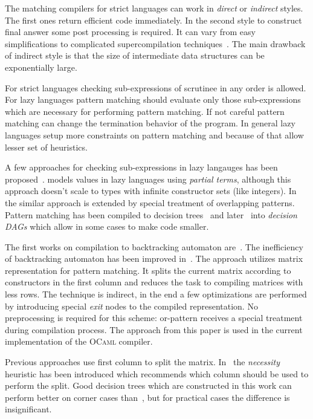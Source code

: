 The matching compilers for strict languages can work in \emph{direct} or \emph{indirect} styles. The first ones return efficient code immediately. In the second style to
construct final answer some post processing is required. It can vary from easy simplifications to complicated supercompilation techniques~\cite{sestoft1996}. The main
drawback of indirect style is that the size of intermediate data structures can be exponentially large.

For strict languages checking sub-expressions of scrutinee in any order is allowed. For lazy languages pattern matching should evaluate only those sub-expressions which are
necessary for performing pattern matching. If not careful pattern matching can change the termination behavior of the program. In general lazy languages setup more constraints
on pattern matching and because of that allow lesser set of heuristics.

A few approaches for checking sub-expressions in lazy langauges has been proposed~\cite{augustsson1985,laville1991}. \cite{laville1991} models values in lazy languages
using \emph{partial terms}, although this approach doesn't scale to types with infinite constructor sets (like integers). In~\cite{suarez1993} the similar approach is
extended by special treatment of overlapping patterns. Pattern matching has been compiled to decision trees~\cite{maranget1992} and later~\cite{maranget1992} into
\emph{decision DAGs} which allow in some cases to make code smaller.

The first works on compilation to backtracking automaton are~\cite{augustsson1985,wadler1987}. The inefficiency of backtracking automaton has been
improved in~\cite{maranget2001}. The approach utilizes matrix representation for pattern matching. It splits the current matrix according to constructors in the
first column and reduces the task to compiling matrices with less rows. The technique is indirect, in the end a few optimizations are performed by introducing
special \emph{exit} nodes to the compiled representation. No preprocessing is required for this scheme: or-pattern receives a special treatment during compilation process.
The approach from this paper is used in the current implementation of the \textsc{OCaml} compiler.

Previous approaches use first column to split the matrix. In~\cite{maranget2008} the \emph{necessity} heuristic has been introduced which recommends which column should be
used to perform the split. Good decision trees which are constructed in this work can perform better on corner cases than~\cite{maranget2001}, but for practical cases the
difference is insignificant.

